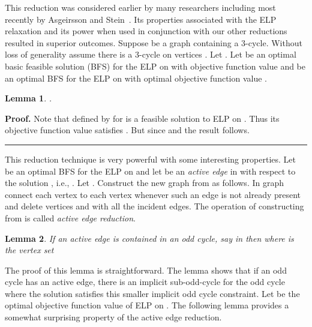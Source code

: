 \documentclass[12pt]{article}
\newtheorem{lemma}{Lemma}
\newenvironment{proof}[1][Proof]{\textbf{#1.} }{\ \rule{0.5em}{0.5em}}
\begin{document}
 This reduction was considered
earlier by many researchers including most recently by Asgeirsson
and Stein~\cite{stein,stein1}. Its properties associated with the
ELP relaxation and its power when used in conjunction with our other
reductions resulted in superior outcomes. Suppose  be a graph
containing a 3-cycle. Without loss of generality assume there is a
3-cycle on vertices . Let . Let  be an optimal
basic feasible solution (BFS) for the ELP on  with objective
function value  and  be an optimal BFS for the ELP on  with
optimal objective function value .
\begin{lemma}\label{3c1}.\end{lemma}
\begin{proof}Note that   defined by  for
  is a feasible solution
to ELP on . Thus its objective function value 
satisfies . But 
since  and the result follows.
\end{proof}

\vskip 10pt

 This reduction technique is
very powerful with some interesting properties. Let  be an
optimal BFS for the ELP on  and let  be an \emph{active
edge} in  with respect to the solution , i.e.,
.  Let . Construct the new
graph  from  as follows. In graph  connect each
vertex  to each vertex  whenever such an edge is
not already present and delete vertices  and  with all the
incident edges. The operation of constructing  from 
is called \emph{active edge reduction}.

\begin{lemma}\label{ll1} If an active edge  is contained in
an odd cycle, say  in  then
 where
 is the vertex set \end{lemma}

The proof of this lemma is straightforward. The lemma shows that if
an odd cycle has an active edge, there is an implicit sub-odd-cycle
for the odd cycle where the solution  satisfies this smaller
implicit odd cycle constraint. Let  be the optimal
objective function value of ELP on . The following lemma
provides a somewhat surprising property of the active edge
reduction.
\end{document}
